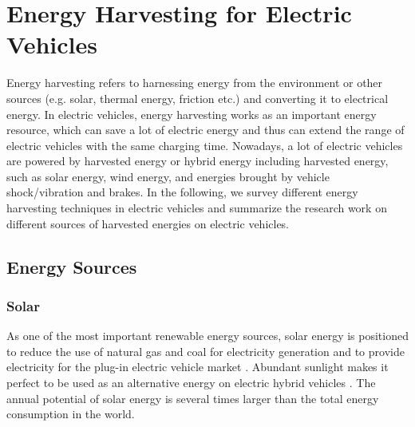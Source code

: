 \section{Energy Harvesting for Electric Vehicles} \label{sec:harvesting}

Energy harvesting refers to harnessing energy from the environment or other sources (e.g. solar, thermal energy, friction etc.) and converting it to electrical energy.
In electric vehicles, energy harvesting works as an important energy resource, which can save a lot of electric energy and thus can extend the range of electric vehicles with the same charging time.
Nowadays, a lot of electric vehicles are powered by harvested energy or hybrid energy including harvested energy, such as solar energy, wind energy, and energies brought by vehicle shock/vibration and brakes.
In the following, we survey different energy harvesting techniques in electric vehicles and summarize the research work on different sources of harvested energies on electric vehicles.

\subsection{Energy Sources}

\subsubsection{Solar}

As one of the most important renewable energy sources, solar energy is positioned to reduce the use of natural gas and coal for electricity generation and to provide electricity for the plug-in electric vehicle market \cite{JX_fthenakis2009technical}.
Abundant sunlight makes it perfect to be used as an alternative energy on electric hybrid vehicles \cite{JX_singh2012study,JX_bourgeois2015harvesting}.
The annual potential of solar energy is several times larger than the total energy consumption in the world.

